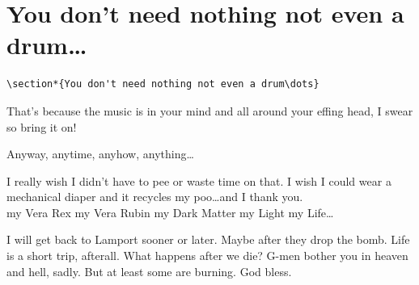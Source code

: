 \documentclass[10pt|draft]{report}
\begin{document}
\section*{You don't need nothing not even a drum\dots}
\begin{verbatim}
\section*{You don't need nothing not even a drum\dots}
\end{verbatim}

That's because the music is in your mind and all around your effing head, I swear so bring it on!

Anyway, anytime, anyhow, anything\dots

I really wish I didn't have to pee or waste time on that. I wish I could wear a mechanical diaper and it recycles my poo\dots and I thank you. \\
\hspace{1in}my Vera Rex my Vera Rubin my Dark Matter my Light my Life\hspace{1in}\dots

I will get back to Lamport sooner or later. Maybe after they drop the bomb. Life is a short trip, afterall. What happens after we die? G-men bother you in heaven and hell, sadly. But at least some are burning. God bless.
\end{document}
